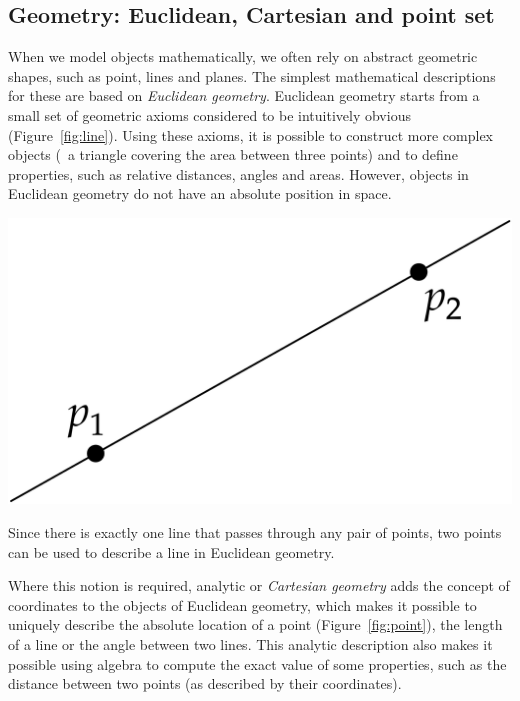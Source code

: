 \subsection{Geometry: Euclidean, Cartesian and point set}

When we model objects mathematically, we often rely on abstract geometric shapes, such as point, lines and planes.
The simplest mathematical descriptions for these are based on \emph{Euclidean geometry}.
Euclidean geometry starts from a small set of geometric axioms considered to be intuitively obvious (Figure~\ref{fig:line}).
Using these axioms, it is possible to construct more complex objects (\eg\ a triangle covering the area between three points) and to define properties, such as relative distances, angles and areas.
However, objects in Euclidean geometry do not have an absolute position in space.

\begin{marginfigure}
\centering
\includegraphics[width=\linewidth]{figs/line.pdf}
\caption[Two points can be used to describe a line in Euclidean geometry]{Since there is exactly one line that passes through any pair of points, two points can be used to describe a line in Euclidean geometry.}%
\label{fig:line}
\end{marginfigure}

Where this notion is required, analytic or \emph{Cartesian geometry} adds the concept of coordinates to the objects of Euclidean geometry, which makes it possible to uniquely describe the absolute location of a point (Figure~\ref{fig:point}), the length of a line or the angle between two lines.
This analytic description also makes it possible using algebra to compute the exact value of some properties, such as the distance between two points (as described by their coordinates).

